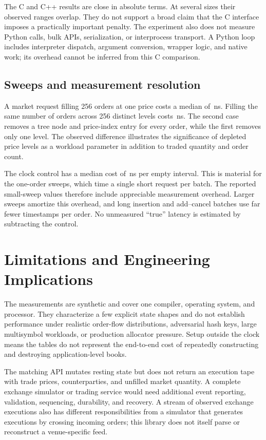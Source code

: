 \documentclass[10pt,letterpaper,twocolumn]{article}
\begin{document}
The C and C++ results are close in absolute terms. At several sizes their
observed ranges overlap. They do not support a broad claim that the C
interface imposes a practically important penalty. The experiment also does
not measure Python calls, bulk APIs, serialization, or interprocess transport.
A Python loop includes interpreter dispatch, argument conversion, wrapper
logic, and native work; its overhead cannot be inferred from this C comparison.

\subsection{Sweeps and measurement resolution}
A market request filling 256 orders at one price costs a median of
\StudyFifoLast{}\,ns. Filling the same number of orders across 256 distinct
levels costs \StudyLevelsLast{}\,ns. The second case removes a tree node and
price-index entry for every order, while the first removes only one level.
The observed difference illustrates the significance of depleted price levels
as a workload parameter in addition to traded quantity and order count.

The clock control has a median cost of \StudyClock{}\,ns per empty interval.
This is material for the one-order sweeps, which time a single short request
per batch. The reported small-sweep values therefore include appreciable
measurement overhead. Larger sweeps amortize this overhead, and long insertion
and add--cancel batches use far fewer timestamps per order. No unmeasured
``true'' latency is estimated by subtracting the control.

\section{Limitations and Engineering Implications}
The measurements are synthetic and cover one compiler, operating system, and
processor. They characterize a few explicit state shapes and do not establish
performance under realistic order-flow distributions, adversarial hash keys,
large multisymbol workloads, or production allocator pressure. Setup outside
the clock means the tables do not represent the end-to-end cost of repeatedly
constructing and destroying application-level books.

The matching API mutates resting state but does not return an execution tape
with trade prices, counterparties, and unfilled market quantity. A complete
exchange simulator or trading service would need additional event reporting,
validation, sequencing, durability, and recovery. A stream of observed exchange
executions also has different responsibilities from a simulator that generates
executions by crossing incoming orders; this library does not itself parse or
reconstruct a venue-specific feed.
\end{document}
